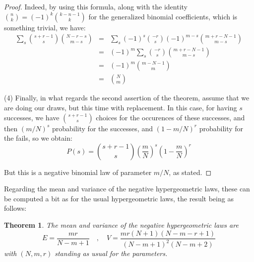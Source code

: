 \documentclass[12pt]{amsbook}
\newtheorem{theorem}{Theorem}[chapter]
\begin{document}
\begin{proof}
Indeed, by using this formula, along with the identity $\binom{n}{k}=(-1)^k\binom{k-n-1}{k}$ for the generalized binomial coefficients, which is something trivial, we have:
\begin{eqnarray*}
\sum_s\binom{s+r-1}{s}\binom{N-r-s}{m-s}
&=&\sum_s(-1)^s\binom{-r}{s}(-1)^{m-s}\binom{m+r-N-1}{m-s}\\
&=&(-1)^m\sum_s\binom{-r}{s}\binom{m+r-N-1}{m-s}\\
&=&(-1)^m\binom{m-N-1}{m}\\
&=&\binom{N}{m}
\end{eqnarray*}

(4) Finally, in what regards the second assertion of the theorem, assume that we are doing our draws, but this time with replacement. In this case, for having $s$ successes, we have $\binom{s+r-1}{s}$ choices for the occurences of these successes, and then $(m/N)^s$ probability for the successes, and $(1-m/N)^r$ probability for the fails, so we obtain:
$$P(s)=\binom{s+r-1}{s}\left(\frac{m}{N}\right)^s\left(1-\frac{m}{N}\right)^r$$

But this is a negative binomial law of parameter $m/N$, as stated.
\end{proof}

Regarding the mean and variance of the negative hypergeometric laws, these can be computed a bit as for the usual hypergeometric laws, the result being as follows:

\begin{theorem}
The mean and variance of the negative hypergeometric laws are
$$E=\frac{mr}{N-m+1}\quad,\quad V=\frac{mr(N+1)(N-m-r+1)}{(N-m+1)^2(N-m+2)}$$
with $(N,m,r)$ standing as usual for the parameters.
\end{theorem}
\end{document}
